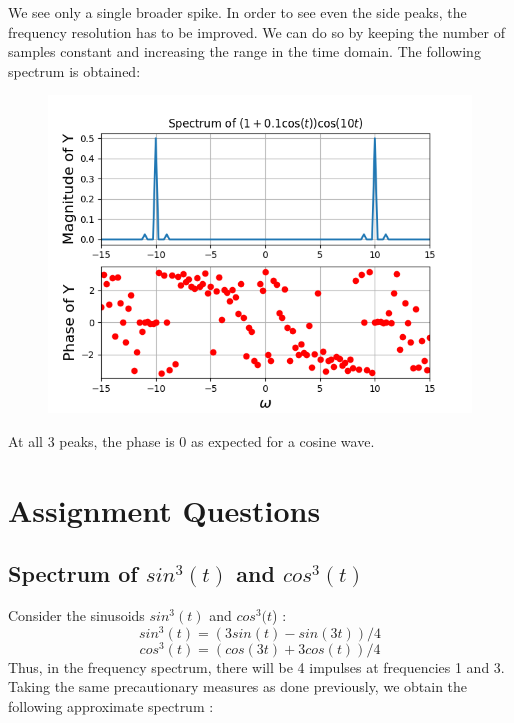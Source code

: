 \documentclass[11pt, a4paper]{article}
\begin{document}
We see only a single broader spike. In order to see even the side peaks, the frequency resolution has to be improved. We can do so by keeping the number of samples constant and increasing the range in the time domain. The following spectrum is obtained:

\begin{figure}[!tbh]
\centering
\includegraphics[scale=0.8]{assgn9_plot4.png} 
\label{fig4}
\end{figure} 
At all 3 peaks, the phase is 0 as expected for a cosine wave.

\section*{Assignment Questions}

\subsection*{Spectrum of $sin^3(t)$ and $cos^3(t)$}
Consider the sinusoids $sin^3(t)$ and $cos^3(t$) :
\begin{equation*}
sin^3(t)=(3sin(t)-sin(3t))/4
\end{equation*}
\begin{equation*}
cos^3(t)=(cos(3t)+3cos(t))/4
\end{equation*}
Thus, in the frequency spectrum, there will be 4 impulses at frequencies 1 and 3.
\newline
Taking the same precautionary measures as done previously, we obtain the following approximate spectrum :
\end{document}
